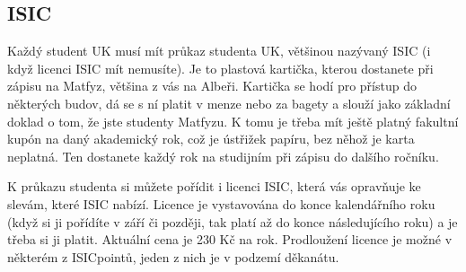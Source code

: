\subsection{ISIC}
Každý student UK musí mít průkaz studenta UK, většinou nazývaný ISIC (i když
licenci ISIC mít nemusíte). Je to plastová kartička, kterou dostanete při zápisu
na Matfyz, většina z vás na Albeři. Kartička se hodí pro přístup do některých
budov, dá se s ní platit v menze nebo za bagety a slouží jako základní doklad o
tom, že jste studenty Matfyzu. K tomu je třeba mít ještě platný fakultní kupón
na daný akademický rok, což je ústřižek papíru, bez něhož je karta neplatná. Ten
dostanete každý rok na studijním při zápisu do dalšího ročníku.

K průkazu studenta si můžete pořídit i licenci ISIC, která vás opravňuje ke
slevám, které ISIC nabízí. Licence je vystavována do konce kalendářního roku
(když si ji pořídíte v září či později, tak platí až do konce následujícího
roku) a je třeba si ji platit. Aktuální cena je 230 Kč na rok. Prodloužení
licence je možné v některém z ISICpointů, jeden z nich je v podzemí děkanátu.